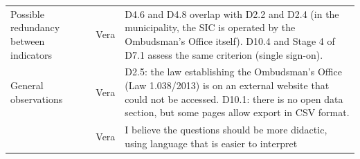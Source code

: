 \documentclass[12pt]{article}
\begin{document}
\begin{longtable}{@{}L{0.235\textwidth}L{0.125\textwidth}L{0.575\textwidth}@{}}
\addlinespace[4pt]\midrule
Possible redundancy between indicators 
 & Vera & D4.6 and D4.8 overlap with D2.2 and D2.4 (in the municipality, the SIC is operated by the Ombudsman's Office itself). D10.4 and Stage 4 of D7.1 assess the same criterion (single sign-on). \\
\addlinespace[4pt]\midrule
General observations
 & Vera & D2.5: the law establishing the Ombudsman's Office (Law 1.038/2013) is on an external website that could not be accessed. D10.1: there is no open data section, but some pages allow export in CSV format. \\
 & Vera & I believe the questions should be more didactic, using language that is easier to interpret \\
\end{longtable}
\endgroup

\begingroup
\footnotesize
\setlength{\tabcolsep}{3pt}
\renewcommand{\arraystretch}{1.13}
\end{document}

